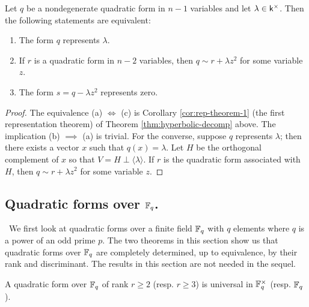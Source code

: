 \begin{corollary}
    Let \(q\) be a nondegenerate quadratic form in \(n - 1\) variables and let \(\lambda \in \mathsf{k}^{\times}\). Then the following statements are equivalent:

    \smallskip

    \begin{enumerate}[nosep, label=(\alph*)]
        \item The form \(q\) represents \(\lambda\).
        \item If \(r\) is a quadratic form in \(n - 2\) variables, then \(q \sim r + \lambda z^2\) for some variable \(z\).
        \item The form \(s = q - \lambda z^2\) represents zero.
    \end{enumerate}
\end{corollary}

\begin{proof}
    The equivalence (a) \(\iff\) (c) is Corollary \ref{cor:rep-theorem-1} (the first representation theorem) of Theorem \ref{thm:hyperbolic-decomp} above. The implication (b) \(\implies\) (a) is trivial. For the converse, suppose \(q\) represents \(\lambda\); then there exists a vector \(x\) such that \(q(x) = \lambda\). Let \(H\) be the orthogonal complement of \(x\) so that \(V = H \perp \langle \lambda \rangle.\) If \(r\) is the quadratic form associated with \(H\), then \(q \sim r + \lambda z^2\) for some variable \(z\).
\end{proof}

\subsection{Quadratic forms over \(\mathbb{F}_q\).}~We first look at quadratic forms over a finite field \(\mathbb{F}_q\) with \(q\) elements where \(q\) is a power of an odd prime \(p\). The two theorems in this section show us that quadratic forms over \(\mathbb{F}_q\) are completely determined, up to equivalence, by their rank and discriminant. The results in this section are not needed in the sequel.\label{sec:quadratic-forms-fq}

\begin{theoremx}{\normalfont\cite[p.~34]{serre2012course}}
    A quadratic form over \(\mathbb{F}_q\) of rank \(r \geq 2\) (resp. \(r \geq 3\)) is universal in \(\mathbb{F}_q^\times\) (resp. \(\mathbb{F}_q\)).\label{thm:universal-forms-in-fq}
\end{theoremx}

